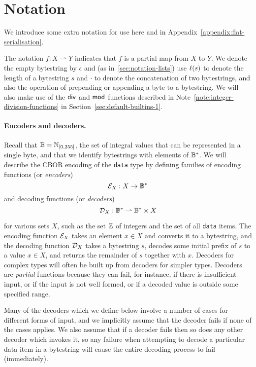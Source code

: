 \section{Notation}
We introduce some extra notation for use here and in
Appendix~\ref{appendix:flat-serialisation}.

\medskip
\noindent The notation $f: X \rightharpoonup Y$ indicates that $f$ is a partial
map from $X$ to $Y$.  We denote the empty bytestring by $\epsilon$ and (as
in~\ref{sec:notation-lists}) use $\operatorname{\ell}(s)$ to denote the length of a
bytestring $s$ and $\cdot$ to denote the concatenation of two bytestrings, and
also the operation of prepending or appending a byte to a bytestring. We will
also make use of the $\operatorname{\mathsf{div}}$ and $\operatorname{\mathsf{mod}}$ functions described in
Note~\ref{note:integer-division-functions} in
Section~\ref{sec:default-builtins-1}.%

\paragraph{Encoders and decoders.}
Recall that $\mathbb{B} = \mathbb{N}_{[0,255]}$, the set of integral values that can
be represented in a single byte, and that we identify bytestrings with elements
of $\mathbb{B}^*$. We will describe the CBOR encoding of the \texttt{data} type by
defining families of encoding functions (or \textit{encoders})
$$
\mathcal{E}_X : X \rightarrow \mathbb{B}^*
$$%
and decoding functions (or \textit{decoders})
$$
\mathcal{D}_X : \mathbb{B}^* \rightharpoonup \mathbb{B}^* \times X
$$%

\noindent for various sets $X$, such as the set $\mathbb{Z}$ of integers and the set of
all \texttt{data} items.  The encoding function $\mathcal{E}_X$ takes an element $x \in
X$ and converts it to a bytestring, and the decoding function $\mathcal{D}_X$ takes a
bytestring $s$, decodes some initial prefix of $s$ to a value $x \in X$, and
returns the remainder of $s$ together with $x$.  Decoders for complex types will
often be built up from decoders for simpler types.  Decoders are
\textit{partial} functions because they can fail, for instance, if there is
insufficient input, or if the input is not well formed, or if a decoded value is
outside some specified range.

Many of the decoders which we define below involve a number of cases for
different forms of input, and we implicitly assume that the decoder fails if
none of the cases applies.  We also assume that if a decoder fails then so does
any other decoder which invokes it, so any failure when attempting to decode a
particular data item in a bytestring will cause the entire decoding process to
fail (immediately).

